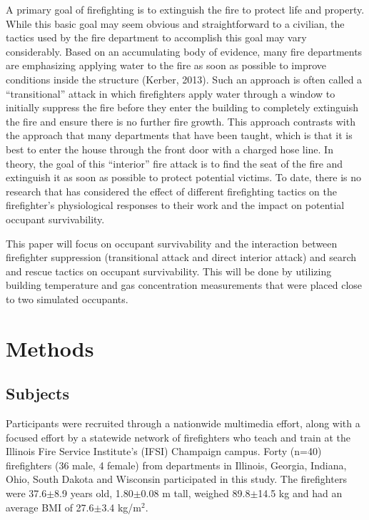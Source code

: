 \documentclass[12pt,oneside]{article}
\begin{document}
A primary goal of firefighting is to extinguish the fire to protect life and property. While this basic goal may seem obvious and straightforward to a civilian, the tactics used by the fire department to accomplish this goal may vary considerably. Based on an accumulating body of evidence, many fire departments are emphasizing applying water to the fire as soon as possible to improve conditions inside the structure (Kerber, 2013). Such an approach is often called a ``transitional'' attack in which firefighters apply water through a window to initially suppress the fire before they enter the building to completely extinguish the fire and ensure there is no further fire growth.  This approach contrasts with the approach that many departments that have been taught, which is that it is best to enter the house through the front door with a charged hose line. In theory, the goal of this ``interior'' fire attack is to find the seat of the fire and extinguish it as soon as possible to protect potential victims. To date, there is no research that has considered the effect of different firefighting tactics on the firefighter's physiological responses to their work and the impact on potential occupant survivability.

This paper will focus on occupant survivability and the interaction between firefighter suppression (transitional attack and direct interior attack) and search and rescue tactics on occupant survivability.  This will be done by utilizing building temperature and gas concentration measurements that were placed close to two simulated occupants.  

\section{Methods}
\label{sec:methods}

\subsection{Subjects}
Participants were recruited through a nationwide multimedia effort, along with a focused effort by a statewide network of firefighters who teach and train at the Illinois Fire Service Institute's (IFSI) Champaign campus. Forty (n=40) firefighters (36 male, 4 female) from departments in Illinois, Georgia, Indiana, Ohio, South Dakota and Wisconsin participated in this study. The firefighters were 37.6$\pm$8.9 years old, 1.80$\pm$0.08 m tall, weighed 89.8$\pm$14.5 kg and had an average BMI of 27.6$\pm$3.4 kg/m$^2$.
\end{document}
